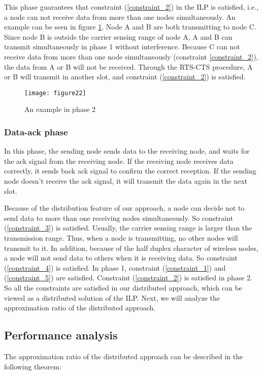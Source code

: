 \documentclass[conference]{IEEEtran}
\begin{document}
This phase guarantees that constraint (\ref{constraint_2}) in the
ILP is satisfied, i.e., a node can not receive data from more than
one nodes simultaneously. An example can be seen in figure
\ref{Fig:example in phase 2}. Node A and B are both transmitting to
node C. Since node B is outside the carrier sensing range of node A,
A and B can transmit simultaneously in phase 1 without interference.
Because C can not receive data from more than one node
simultaneously (constraint \ref{constraint_2}), the data from A or B
will not be received. Through the RTS-CTS procedure, A or B will
transmit in another slot, and constraint (\ref{constraint_2}) is
satisfied.
\begin{figure}[!h]
\centering
\texttt{[image: figure22]}
\caption{An example in phase 2} \label{Fig:example in phase 2}
\end{figure}
\subsubsection{Data-ack phase}
In this phase, the sending node sends data to the receiving node,
and waits for the ack signal from the receiving node. If the
receiving node receives data correctly, it sends back ack signal to
confirm the correct reception. If the sending node doesn't receive
the ack signal, it will transmit the data again in the next slot.

Because of the distribution feature of our approach, a node can
decide not to send data to more than one receiving nodes
simultaneously. So constraint (\ref{constraint_3}) is satisfied.
Usually, the carrier sensing range is larger than the transmission
range. Thus, when a node is transmitting, no other nodes will
transmit to it. In addition, because of the half duplex character of
wireless nodes, a node will not send data to others when it is
receiving data. So constraint (\ref{constraint_4}) is satisfied. In
phase 1, constraint (\ref{constraint_1}) and (\ref{constraint_5})
are satisfied. Constraint (\ref{constraint_2}) is satisfied in phase
2. So all the constraints are satisfied in our distributed approach,
which can be viewed as a distributed solution of the ILP. Next, we
will analyze the approximation ratio of the distributed approach.
\subsection{Performance analysis}
The approximation ratio of the distributed approach can be described
in the following theorem:
\end{document}
